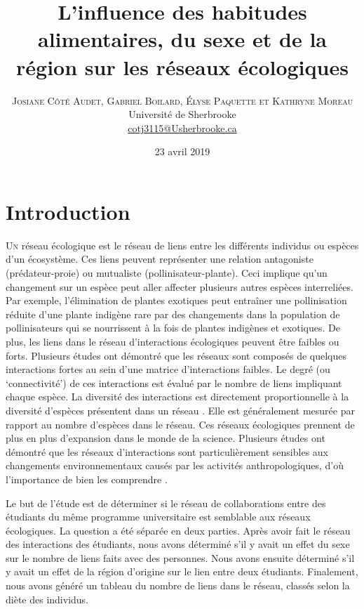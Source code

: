 \documentclass[twoside,twocolumn]{article}
\title{L'influence des habitudes alimentaires, du sexe et de la région sur les réseaux écologiques}
\author{
\textsc{Josiane Côté Audet, Gabriel Boilard, Élyse Paquette et Kathryne Moreau}\\ [1ex]
\normalsize Université de Sherbrooke\\
\normalsize \href{mailto:cotj3115@Usherbrooke.ca}{cotj3115@Usherbrooke.ca}
}
\date{23 avril 2019}
\begin{document}
\maketitle




\section{Introduction}

\lettrine[nindent=0em,lines=3]{U}
n réseau écologique est le réseau de liens entre les différents individus ou espèces d’un écosystème. Ces liens peuvent représenter une relation antagoniste (prédateur-proie) ou mutualiste (pollinisateur-plante). Ceci implique qu’un changement sur un espèce peut aller affecter plusieurs autres espèces interreliées. Par exemple, l'élimination de plantes exotiques peut entraîner une pollinisation réduite d'une plante indigène rare par des changements dans la population de pollinisateurs qui se nourrissent à la fois de plantes indigènes et exotiques. De plus, les liens dans le réseau d’interactions écologiques peuvent être faibles ou forts. Plusieurs études ont démontré que les réseaux sont composés de quelques interactions fortes au sein d’une matrice d’interactions faibles. Le degré (ou ‘connectivité’) de ces interactions est évalué par le nombre de liens impliquant chaque espèce. La diversité des interactions est directement proportionnelle à la diversité d’espèces présentent dans un réseau \citep{tylianakis2010conservation}. Elle est généralement mesurée par rapport au nombre d’espèces dans le réseau.  Ces réseaux écologiques prennent de plus en plus d’expansion dans le monde de la science. Plusieurs études ont démontré que les réseaux d’interactions sont particulièrement sensibles aux changements environnementaux causés par les activités anthropologiques, d’où l’importance de bien les comprendre \citep{morris2010anthropogenic}.

Le but de l’étude est de déterminer si le réseau de collaborations entre des étudiants du même programme universitaire est semblable aux réseaux écologiques. La question a été séparée en deux parties. Après avoir fait le réseau des interactions des étudiants, nous avons déterminé s’il y avait un effet du sexe sur le nombre de liens faits avec des personnes. Nous avons ensuite déterminé s’il y avait un effet de la région d’origine sur le lien entre deux étudiants. Finalement, nous avons généré un tableau du nombre de liens dans le réseau, classés selon la diète des individus.
\end{document}
